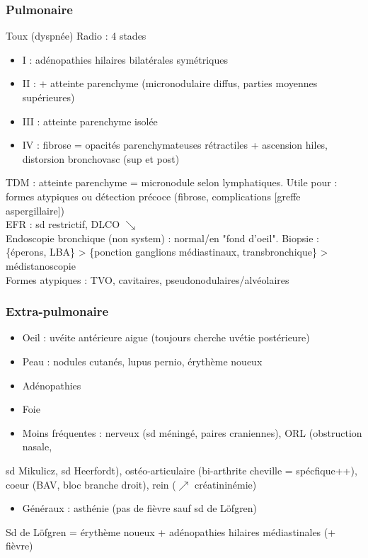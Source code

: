 \subsubsection{Pulmonaire}
\label{sec:org4ec1d7e}
Toux (dyspnée)
Radio : 4 stades
\begin{itemize}
\item I : adénopathies hilaires bilatérales symétriques
\item II : + atteinte parenchyme (micronodulaire diffus, parties moyennes supérieures)
\item III : atteinte parenchyme isolée
\item IV : fibrose = opacités parenchymateuses rétractiles + ascension hiles, distorsion bronchovasc (sup et post)
\end{itemize}
TDM : atteinte parenchyme = micronodule selon lymphatiques. Utile pour : formes atypiques ou détection précoce (fibrose, complications [greffe aspergillaire])\\
EFR : sd restrictif, DLCO $\searrow$\\
Endoscopie bronchique (non system) : normal/en "fond d'oeil". Biopsie : \{éperons, LBA\} > \{ponction ganglions médiastinaux, transbronchique\} > médistanoscopie\\
Formes atypiques : TVO, cavitaires, pseudonodulaires/alvéolaires

\subsubsection{Extra-pulmonaire}
\label{sec:org316c190}
\begin{itemize}
\item Oeil : uvéite antérieure aigue (toujours cherche uvétie postérieure)
\item Peau : nodules cutanés, lupus pernio, érythème noueux
\item Adénopathies
\item Foie
\item Moins fréquentes : nerveux (sd méningé, paires craniennes), ORL (obstruction
nasale,
\end{itemize}
sd Mikulicz, sd Heerfordt), ostéo-articulaire (bi-arthrite cheville =
spécfique++), 
coeur (BAV, bloc branche droit), rein (\(\nearrow\) créatininémie)
\begin{itemize}
\item Généraux : asthénie (pas de fièvre sauf sd de Löfgren)
\end{itemize}
Sd de Löfgren = érythème noueux + adénopathies hilaires médiastinales (+ fièvre)
